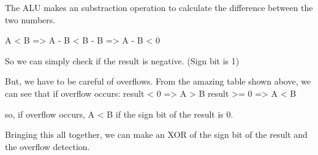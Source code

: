 \documentclass[11pt,a4paper]{article}
\begin{document}
The ALU makes an substraction operation to calculate the difference between the two numbers.

A < B => A - B < B - B => A - B < 0

So we can simply check if the result is negative. (Sign bit is 1)

But, we have to be careful of overflows. From the amazing table shown above, we can see 
that if overflow occurs:
result < 0 => A > B
result >= 0 => A < B

so, if overflow occurs, A < B if the sign bit of the result is 0.

Bringing this all together, we can make an XOR of the sign bit of the result and the overflow detection.

\end{document}
